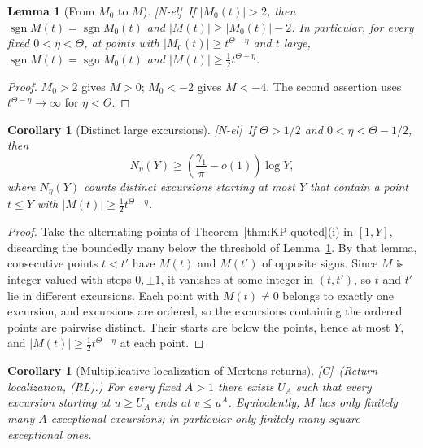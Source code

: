 \documentclass[11pt]{amsart}
\numberwithin{equation}{section}
\theoremstyle{plain}
\newtheorem{lemma}[theorem]{Lemma}
\newtheorem{corollary}[theorem]{Corollary}
\theoremstyle{definition}
\theoremstyle{remark}
\DeclareMathOperator{\sgn}{sgn}
\newcommand{\tagNE}{\textup{[N-el]}}
\newcommand{\tagC}{\textup{[C]}}
\begin{document}
\begin{lemma}[From $M_0$ to $M$]
\label{lem:KP-translation}
\tagNE\ If $|M_0(t)|>2$, then $\sgn M(t)=\sgn M_0(t)$ and
$|M(t)|\ge|M_0(t)|-2$. In particular, for every fixed $0<\eta<\Theta$, at points with
$|M_0(t)|\ge t^{\Theta-\eta}$ and $t$ large,
$\sgn M(t)=\sgn M_0(t)$ and $|M(t)|\ge\frac12t^{\Theta-\eta}$.
\end{lemma}

\begin{proof}
$M_0>2$ gives $M>0$; $M_0<-2$ gives $M<-4$. The second assertion uses
$t^{\Theta-\eta}\to\infty$ for $\eta<\Theta$.
\end{proof}

\begin{corollary}[Distinct large excursions]
\label{cor:KP-large-excursions}
\tagNE\ If $\Theta>1/2$ and $0<\eta<\Theta-1/2$, then
\begin{equation}
\label{eq:KP-large-excursions}
N_\eta(Y)\ge\left(\frac{\gamma_1}{\pi}-o(1)\right)\log Y,
\end{equation}
where $N_\eta(Y)$ counts distinct excursions starting at most $Y$ that
contain a point $t\le Y$ with $|M(t)|\ge\tfrac12 t^{\Theta-\eta}$.
\end{corollary}

\begin{proof}
Take the alternating points of Theorem~\ref{thm:KP-quoted}(i) in $[1,Y]$,
discarding the boundedly many below the threshold of
Lemma~\ref{lem:KP-translation}. By that lemma, consecutive points $t<t'$
have $M(t)$ and $M(t')$ of opposite signs. Since $M$ is integer valued with
steps $0,\pm1$, it vanishes at some integer in $(t,t')$, so $t$ and $t'$ lie
in different excursions. Each point with $M(t)\ne0$ belongs to exactly one
excursion, and excursions are ordered, so the excursions containing the
ordered points are pairwise distinct. Their starts are below the points,
hence at most $Y$, and $|M(t)|\ge\frac12t^{\Theta-\eta}$ at each point.
\end{proof}

\begin{corollary}[Multiplicative localization of Mertens returns]
\label{cor:KP-local-returns}
\tagC\ \textup{(Return localization, (RL).)} For every fixed $A>1$ there exists $U_A$ such that every excursion starting
at $u\ge U_A$ ends at $v\le u^A$. Equivalently, $M$ has only finitely many
$A$-exceptional excursions; in particular only finitely many
square-exceptional ones.
\end{corollary}
\end{document}
